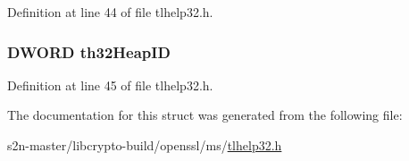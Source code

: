 Definition at line 44 of file tlhelp32.\+h.

\subsubsection[{\texorpdfstring{th32\+Heap\+ID}{th32HeapID}}]{\setlength{\rightskip}{0pt plus 5cm}D\+W\+O\+RD th32\+Heap\+ID}\hypertarget{structtag_h_e_a_p_e_n_t_r_y32_a382f1b4f880ccd90252ea23ad7adec98}{}\label{structtag_h_e_a_p_e_n_t_r_y32_a382f1b4f880ccd90252ea23ad7adec98}


Definition at line 45 of file tlhelp32.\+h.



The documentation for this struct was generated from the following file\+:\begin{DoxyCompactItemize}
\item 
s2n-\/master/libcrypto-\/build/openssl/ms/\hyperlink{tlhelp32_8h}{tlhelp32.\+h}\end{DoxyCompactItemize}
